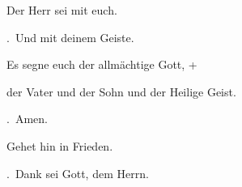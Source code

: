 Der Herr sei mit euch.

\Rbar.~Und mit deinem Geiste.

Es segne euch der allmächtige Gott, + \par der Vater und der Sohn und der Heilige Geist.

\Rbar.~Amen.

Gehet hin in Frieden.

\Rbar.~Dank sei Gott, dem Herrn.
